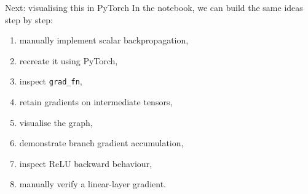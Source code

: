 \documentclass[10pt,aspectratio=169]{beamer}
\begin{document}
\begin{frame}[t]{Next: visualising this in PyTorch}
In the notebook, we can build the same ideas step by step:

\begin{enumerate}
    \item manually implement scalar backpropagation,
    \item recreate it using PyTorch,
    \item inspect \texttt{grad\_fn},
    \item retain gradients on intermediate tensors,
    \item visualise the graph,
    \item demonstrate branch gradient accumulation,
    \item inspect ReLU backward behaviour,
    \item manually verify a linear-layer gradient.
\end{enumerate}
\end{frame}
\end{document}
